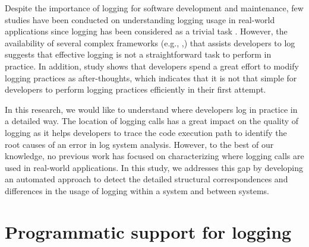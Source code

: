 Despite the importance of logging for software development and maintenance, few studies have been conducted on understanding logging usage in real-world applications since logging has been considered as a trivial task \cite{clarke1999dimension,clarke1999subject}. However, the availability of several complex frameworks (e.g., ,) that assists developers to log suggests that effective logging is not a straightforward task to perform in practice. In addition, \citet{yuan2012characterizing} study shows that developers spend a great effort to modify logging practices as after-thoughts, which indicates that it is not that simple for developers to perform logging practices efficiently in their first attempt.

In this research, we would like to understand where developers log in practice in a detailed way. The location of logging calls has a great impact on the quality of logging as it helps developers to trace the code execution path to identify the root causes of an error in log system analysis. However, to the best of our knowledge, no previous work has focused on characterizing where logging calls are used in real-world applications. 
In this study, we addresses this gap by developing an automated approach to detect the detailed structural correspondences and differences in the usage of logging within a system and between systems. 




\section{Programmatic support for logging} \label{background Logging}

